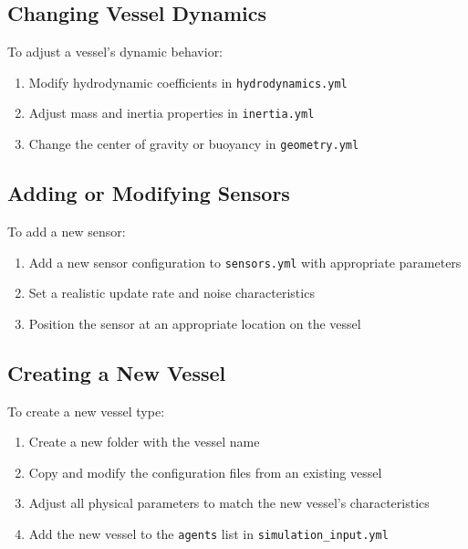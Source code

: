 \documentclass[
  letterpaper,
  DIV=11,
  numbers=noendperiod]{scrreprt}
\providecommand{\tightlist}{%
  \setlength{\itemsep}{0pt}\setlength{\parskip}{0pt}}\usepackage{longtable,booktabs,array}
\begin{document}
\subsection*{Changing Vessel Dynamics}\label{changing-vessel-dynamics}

To adjust a vessel's dynamic behavior:

\begin{enumerate}
\def\labelenumi{\arabic{enumi}.}
\tightlist
\item
  Modify hydrodynamic coefficients in \texttt{hydrodynamics.yml}
\item
  Adjust mass and inertia properties in \texttt{inertia.yml}
\item
  Change the center of gravity or buoyancy in \texttt{geometry.yml}
\end{enumerate}

\subsection*{Adding or Modifying
Sensors}\label{adding-or-modifying-sensors}

To add a new sensor:

\begin{enumerate}
\def\labelenumi{\arabic{enumi}.}
\tightlist
\item
  Add a new sensor configuration to \texttt{sensors.yml} with
  appropriate parameters
\item
  Set a realistic update rate and noise characteristics
\item
  Position the sensor at an appropriate location on the vessel
\end{enumerate}

\subsection*{Creating a New Vessel}\label{creating-a-new-vessel}

To create a new vessel type:

\begin{enumerate}
\def\labelenumi{\arabic{enumi}.}
\tightlist
\item
  Create a new folder with the vessel name
\item
  Copy and modify the configuration files from an existing vessel
\item
  Adjust all physical parameters to match the new vessel's
  characteristics
\item
  Add the new vessel to the \texttt{agents} list in
  \texttt{simulation\_input.yml}
\end{enumerate}
\end{document}
